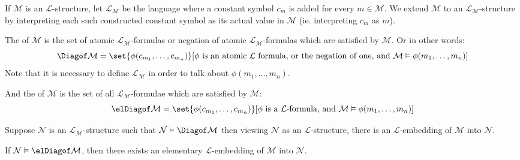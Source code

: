\documentclass[10pt]{article}
\def\mL{\mathcal{L}}
\def\mM{\mathcal{M}}
\def\mN{\mathcal{N}}
\begin{document}
\begin{defn*}

    If $\mM$ is an $\mL$-structure, let $\mL_\mM$ be the language where a constant symbol $c_m$ is added for every $m\in\mM$.
    We extend $\mM$ to an $\mL_\mM$-structure by interpreting each such constructed constant symbol as its actual value in $\mM$ (ie. interpreting $c_m$ as $m$).

    The  of $\mM$ is the set of atomic $\mL_\mM$-formulas or negation of atomic $\mL_\mM$-formulas which are satisfied by $\mM$.
    Or in other words:
    \[ \Diagof\mM = \set{\phi(c_{m_1},\dots,c_{m_n})}[\phi\text{ is an atomic }\mL\text{ formula, or the negation of one, and }\mM\vDash\phi(m_1,\dots,m_n)] \]
    Note that it is necessary to define $\mL_\mM$ in order to talk about $\phi(m_1,\dots,m_n)$.

    And the  of $\mM$ is the set of all $\mL_\mM$-formulae which are satisfied by $\mM$:
    \[ \elDiagof\mM = \set{\phi(c_{m_1},\dots,c_{m_n})}[\phi\text{ is a }\mL\text{-formula, and }\mM\vDash\phi(m_1,\dots,m_n)] \]

\end{defn*}

\begin{lemm*}

    \benum
        \item Suppose $\mN$ is an $\mL_\mM$-structure such that $\mN\vDash\Diagof\mM$ then viewing $\mN$ as an $\mL$-structure, there is an $\mL$-embedding of $\mM$ into $\mN$.
        \item If $\mN\vDash\elDiagof\mM$, then there exists an elementary $\mL$-embedding of $\mM$ into $\mN$.
    \eenum

\end{lemm*}
\end{document}
